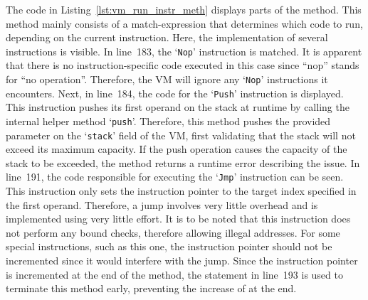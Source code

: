 
The code in Listing~\ref{lst:vm_run_instr_meth} displays parts of the  method.
This method mainly consists of a match-expression that determines which code to run, depending on the current instruction.
Here, the implementation of several instructions is visible.
In line~183, the `\texttt{Nop}' instruction is matched.
It is apparent that there is no instruction-specific code executed in this case since \enquote{nop} stands for \enquote{no operation}.
Therefore, the VM will ignore any `\texttt{Nop}' instructions it encounters.
Next, in line~184, the code for the `\texttt{Push}' instruction is displayed.
This instruction pushes its first operand on the stack at runtime by calling the internal helper method `\texttt{push}'.
Therefore, this method pushes the provided parameter on the `\texttt{stack}' field of the VM,
first validating that the stack will not exceed its maximum capacity.
If the push operation causes the capacity of the stack to be exceeded, the method returns a runtime error describing the issue.
In line~191, the code responsible for executing the `\texttt{Jmp}' instruction can be seen.
This instruction only sets the instruction pointer to the target index specified in the first operand.
Therefore, a jump involves very little overhead and is implemented using very little effort.
It is to be noted that this instruction does not perform any bound checks, therefore allowing illegal addresses.
For some special instructions, such as this one, the instruction pointer should not be incremented since it would interfere with the jump.
Since the instruction pointer is incremented at the end of the method, the  statement in line~193 is used to terminate this method early, preventing the increase of  at the end.

